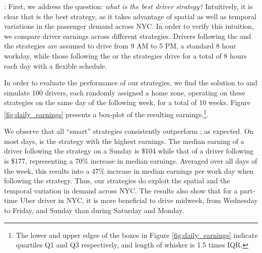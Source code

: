 : First, we address the question: \textit{what is the best driver strategy?} Intuitively, it is clear that {\relocationflexible} is the best strategy, as it takes advantage of spatial as well as temporal variations in the passenger demand across NYC. In order to verify this intuition, we compare driver earnings across different strategies. Drivers following the {\naive} and the {\relocation} strategies are assumed to drive from 9 AM to 5 PM, a standard 8 hour workday, while those following the {\flexible} or the {\relocationflexible} strategies drive for a total of 8 hours each day with a flexible schedule.

In order to evaluate the performance of our strategies, we find the solution to {\originalproblem} and simulate 100 drivers, each randomly assigned a 
home zone, operating on these strategies on the same day of the following week, for a total of 10 weeks. Figure \ref{fig:daily_earnings} presents a box-plot of the resulting earnings.\footnote{The lower and upper edges of the boxes in Figure \ref{fig:daily_earnings} indicate quartiles Q1 and Q3 respectively, and length of whisker is 1.5 times IQR.}.

We observe that all ``smart'' strategies consistently outperform {\naive};
as expected. On most days, {\relocationflexible} is the strategy with the highest earnings.
The median earning of a driver following the {\naive} strategy on a Sunday is \$104 while that of a driver following {\relocationflexible} is \$177, representing a 70\% increase in median earnings. 
Averaged over all days of the week, this results into a 47\% increase in median earnings per work day when following the {\relocationflexible} strategy. 
Thus, our strategies do exploit the spatial and the temporal variation in demand across NYC. The results also show
that for a part-time Uber driver in NYC, it is more beneficial to drive midweek, from Wednesday to Friday, and Sunday
than during Saturday and Monday.



